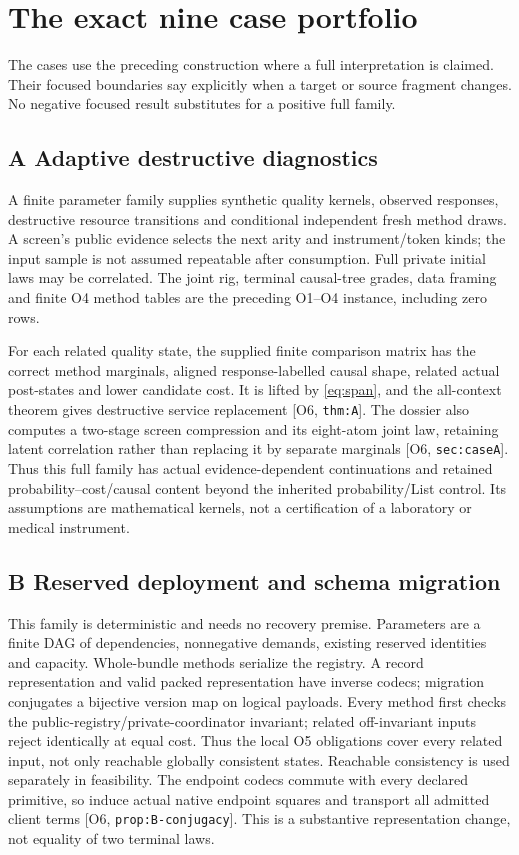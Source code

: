 \documentclass[11pt,a4paper]{article}
\theoremstyle{definition}
\newcommand{\Addr}[2]{\textup{[#1, \texttt{#2}]}}
\begin{document}
\section{The exact nine case portfolio}\label{sec:applications}

The cases use the preceding construction where a full interpretation is
claimed. Their focused boundaries say explicitly when a target or source
fragment changes. No negative focused result substitutes for a positive
full family.

\subsection{A Adaptive destructive diagnostics}
A finite parameter family supplies synthetic quality kernels, observed
responses, destructive resource transitions and conditional independent
fresh method draws. A screen's public evidence selects the next arity and
instrument/token kinds; the input sample is not assumed repeatable after
consumption. Full private initial laws may be correlated. The joint rig,
terminal causal-tree grades, data framing and finite O4 method tables
are the preceding O1--O4 instance, including zero rows.

For each related quality state, the supplied finite comparison matrix has
the correct method marginals, aligned response-labelled causal shape,
related actual post-states and lower candidate cost. It is lifted by
\eqref{eq:span}, and the all-context theorem gives destructive service
replacement \Addr{O6}{thm:A}. The dossier also computes a two-stage
screen compression and its eight-atom joint law, retaining latent
correlation rather than replacing it by separate marginals
\Addr{O6}{sec:caseA}. Thus this full family has actual evidence-dependent
continuations and retained probability--cost/causal content beyond the
inherited probability/List control. Its assumptions are mathematical
kernels, not a certification of a laboratory or medical instrument.

\subsection{B Reserved deployment and schema migration}
This family is deterministic and needs no recovery premise. Parameters
are a finite DAG of dependencies, nonnegative demands, existing reserved
identities and capacity. Whole-bundle methods serialize the registry.
A record representation and valid packed representation have inverse
codecs; migration conjugates a bijective version map on logical payloads.
Every method first checks the public-registry/private-coordinator invariant;
related off-invariant inputs reject identically at equal cost. Thus the
local O5 obligations cover every related input, not only reachable globally
consistent states. Reachable consistency is used separately in feasibility.
The endpoint codecs commute with every declared primitive, so induce
actual native endpoint squares and transport all admitted client terms
\Addr{O6}{prop:B-conjugacy}. This is a substantive representation change,
not equality of two terminal laws.
\end{document}
